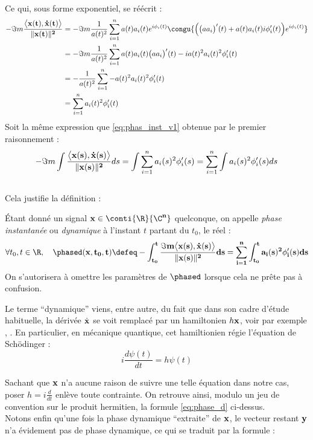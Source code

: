 \\
Ce qui, sous forme exponentiel, se réécrit :
\begin{align*}
	-\Im m\frac{\big\langle \bf{x}(t) , \dot{\bf{x}}(t) \big\rangle}{\|\bf{x}(t)\|^2} &= -\Im m\frac{1}{a(t)^2} \sum_{i=1}^n a(t)a_i(t)e^{i\phi_i(t)}\congu{\Big( \big(aa_i\big)'(t) +a(t)a_i(t)i\phi_i'(t)\Big)e^{i\phi_i(t)}} \\
	&= -\Im m\frac{1}{a(t)^2} \sum_{i=1}^n a(t)a_i(t)\big(aa_i\big)'(t) -ia(t)^2a_i(t)^2\phi_i'(t) \\
	&= -\frac{1}{a(t)^2} \sum_{i=1}^n -a(t)^2a_i(t)^2 \phi_i'(t) \\
	&= \sum_{i=1}^n a_i(t)^2 \phi_i'(t)
\end{align*}
Soit la même expression que \eqref{eq:phas_inst_v1} obtenue par le premier raisonnement :
\[-\Im m\int \frac{\big\langle \bf{x}(s) , \dot{\bf{x}}(s) \big\rangle}{\|\bf{x}(s)\|^2} ds = \int \sum_{i=1}^n a_i(s)^2 \phi_i'(s) = \sum_{i=1}^n \int a_i(s)^2 \phi_i'(s)ds\]
\\
Cela justifie la définition :

\begin{definition} \label{def:phase_d}
	\'Etant donné un signal $\bf{x}\in \conti{\R}{\C^n}$ quelconque, on appelle \emph{phase instantanée} ou \emph{dynamique} à l'instant $t$ partant du $t_0$, le réel :
	\begin{equation} \label{eq:phase_d}
		\forall t_0, t\in\R, \quad \phased(\bf{x}, t_0,t) \defeq -\int_{t_0}^t \frac{\Im m \big\langle \bf{x}(s) , \dot{\bf{x}}(s) \big\rangle}{\|\bf{x}(s)\|^2} ds =\sum_{i=1}^n \int_{t_0}^t a_i(s)^2 \phi_i'(s)ds
	\end{equation}
	On s'autorisera à omettre les paramètres de $\phased$ lorsque cela ne prête pas à confusion.
\end{definition}
\skipl

Le terme ``dynamique'' viens, entre autre, du fait que dans son cadre d'étude habituelle, la dérivée $\dot{\bf{x}}$ se voit remplacé par un hamiltonien $h\bf{x}$, voir par exemple \cite[sec. 2]{bohm_geometric_2003}, \cite[p.~215]{mukunda_quantum_1993}. En particulier, en mécanique quantique, cet hamiltionien régie l'équation de Schödinger :
\begin{equation}\label{eq:schrodinger}
	i\frac{d \psi(t)}{dt} = h\psi(t)
\end{equation}

Sachant que $\bf{x}$ n'a aucune raison de suivre une telle équation dans notre cas, poser $h = i\frac{d}{dt}$ enlève toute contrainte. On retrouve ainsi, modulo un jeu de convention sur le produit hermitien, la formule \eqref{eq:phase_d} ci-dessus.
\\ Notons enfin qu'une fois la phase dynamique ``extraite'' de $\bf{x}$, le vecteur restant $\bf{y}$ n'a évidement pas de phase dynamique, ce qui se traduit par la formule :

